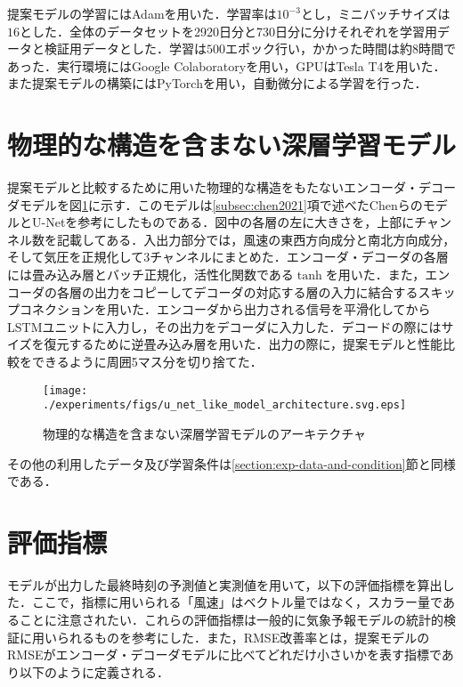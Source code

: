 
提案モデルの学習にはAdam\cite{Kingma2014AdamAM}を用いた．学習率は$10^{-3}$とし，ミニバッチサイズは$16$とした．全体のデータセットを2920日分と730日分に分けそれぞれを学習用データと検証用データとした．学習は$500$エポック行い，かかった時間は約8時間であった．実行環境にはGoogle Colaboratory\cite{GoogleColaboratory}を用い，GPUはTesla T4を用いた．また提案モデルの構築にはPyTorch\cite{NEURIPS2019-9015}を用い，自動微分による学習を行った．

\section{物理的な構造を含まない深層学習モデル \label{section:exp-encoder-decoder-model}}
提案モデルと比較するために用いた物理的な構造をもたないエンコーダ・デコーダモデルを図\ref{fig:exp-encoder-decoder-model}に示す．このモデルは\ref{subsec:chen2021}項で述べたChenらのモデルとU-Net\cite{journals/corr/RonnebergerFB15}を参考にしたものである．図中の各層の左に大きさを，上部にチャンネル数を記載してある．入出力部分では，風速の東西方向成分と南北方向成分，そして気圧を正規化して3チャンネルにまとめた．エンコーダ・デコーダの各層には畳み込み層とバッチ正規化\cite{10.5555/3045118.3045167}，活性化関数である$\tanh$を用いた．また，エンコーダの各層の出力をコピーしてデコーダの対応する層の入力に結合するスキップコネクションを用いた．エンコーダから出力される信号を平滑化してからLSTMユニットに入力し，その出力をデコーダに入力した．デコードの際にはサイズを復元するために逆畳み込み層を用いた．出力の際に，提案モデルと性能比較をできるように周囲5マス分を切り捨てた．

\begin{figure}[bp]
  \centering
  \texttt{[image: ./experiments/figs/u\_net\_like\_model\_architecture.svg.eps]}
  \caption{物理的な構造を含まない深層学習モデルのアーキテクチャ}
  \label{fig:exp-encoder-decoder-model}
\end{figure}

その他の利用したデータ及び学習条件は\ref{section:exp-data-and-condition}節と同様である．

\section{評価指標 \label{section:exp-metrics}}
モデルが出力した最終時刻の予測値と実測値を用いて，以下の評価指標を算出した．ここで，指標に用いられる「風速」はベクトル量ではなく，スカラー量であることに注意されたい．これらの評価指標は一般的に気象予報モデルの統計的検証に用いられるものを参考にした\cite{Kishochou2018}．また，RMSE改善率とは，提案モデルのRMSEがエンコーダ・デコーダモデルに比べてどれだけ小さいかを表す指標であり以下のように定義される．

